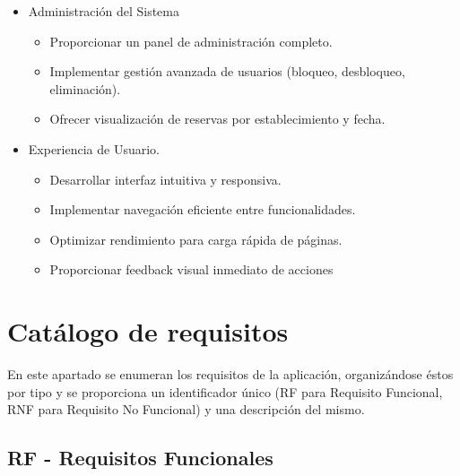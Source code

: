 \begin{itemize}
\item
Administración del Sistema
    \begin{itemize}
    \tightlist
    \item
    Proporcionar un panel de administración completo.
    \item
    Implementar gestión avanzada de usuarios (bloqueo, desbloqueo, eliminación).
    \item
    Ofrecer visualización de reservas por establecimiento y fecha.
    \end{itemize}

\item
Experiencia de Usuario.
    \begin{itemize}
    \tightlist
    \item
    Desarrollar interfaz intuitiva y responsiva.
    \item
    Implementar navegación eficiente entre funcionalidades.
    \item
    Optimizar rendimiento para carga rápida de páginas.
    \item
    Proporcionar feedback visual inmediato de acciones
    \end{itemize}

\end{itemize}

\newpage
\section{Catálogo de requisitos}
En este apartado se enumeran los requisitos de la aplicación, organizándose éstos por tipo y se proporciona un identificador único (RF para Requisito Funcional, RNF para Requisito No Funcional) y una descripción del mismo.

\subsection{RF - Requisitos Funcionales}


